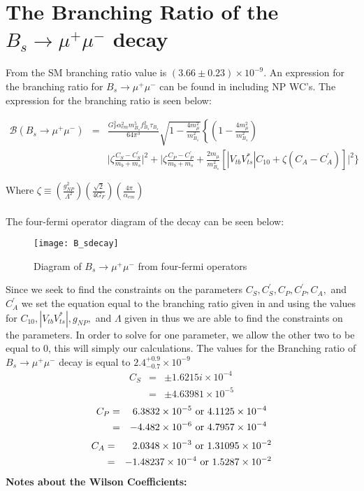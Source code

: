 \documentclass[12pt]{article}
\def \bea{\begin{eqnarray}}
\def \eea{\end{eqnarray}}
\def \({\left(}
\def \){\right)}
\def \lb{\left\{}
\def \nn{\nonumber}
\def \nl{\nn \\}
\def \al{\alpha}
\begin{document}
\section{The Branching Ratio of the $B_s \rightarrow \mu^+\mu^-$ decay}
From \cite{CMS:2014xfa} the SM branching ratio value is $(3.66 \pm 0.23) \times 10 ^ {-9}$. An expression for the branching ratio for $B_s \rightarrow \mu^+\mu^-$ can be found in \cite{Dighe:2012df} including NP WC's. The expression for the branching ratio is seen below:
\begin{center}
\bea
\mathcal{B}(B_s\rightarrow \mu^+\mu^-) &=& \frac{G_F^2 \al_{em}^2 m_{B_s}^5 f_{B_s}^2 \tau_{B_s}}{64\pi^3}\sqrt{1-\frac{4m_\mu^2}{m_{B_s}^2}} \lb\(1-\frac{4m_\mu^2}{m_{B_s}^2}\) \right. \nl 
&& \bigg|\zeta\frac{C_S-C_S^{'}}{m_b+m_s}\bigg|^2+\bigg|\zeta\frac{C_P-C_P^{'}}{m_b+m_s}+\frac{2m_\mu}{m_{B_s}^2}[|V_{tb} V_{ts}^*|C_{10}+\zeta (C_A-C_A^{'})]\bigg|^2\bigg\}
\eea
\end{center}
Where $\zeta \equiv (\frac{g_{NP}^2}{\Lambda^2})(\frac{\sqrt{2}}{4G_F})(\frac{4\pi}{\alpha_{em}})$\\
\\
The four-fermi operator diagram of the decay can be seen below: 
\begin{figure}[h]
\centering
\texttt{[image: B\_sdecay]}
\caption{Diagram of $B_s \rightarrow \mu^+ \mu^-$ from four-fermi operators}
\end{figure}
Since we seek to find the constraints on the parameters $C_S, C_S^{'},C_P, C_P^{'},C_A,$ and $C_A^{'}$ we set the equation equal to the branching ratio given in \cite{flavio} and using the values for $C_{10},|V_{tb} V_{ts}^*|, g_{NP},$ and $\Lambda$ given in \cite{Dighe:2012df} thus we are able to find the constraints on the parameters. In order to solve for one parameter, we allow the other two to be equal to 0, this will simply our calculations. 
The values for the Branching ratio of $B_s\rightarrow \mu^+\mu^- $ decay is equal to $2.4_{-0.7}^{+0.9} \times 10^{-9}$ \cite{Agashe:2014kda}
\bea
C_S&=& \pm 1.6215i \times 10^{-4} \nl
&=& \pm 4.63981\times 10^{-5}\nn
\eea
\bea
C_P&=& 6.3832 \times 10^{-5}~ {\rm or}~ 4.1125\times 10^{-4}\nl
&=&-4.482\times 10^{-6}~ {\rm or}~ 4.7957\times 10^{-4}\nn
\eea
\bea
C_A&=& 2.0348\times 10^{-3}~ {\rm or}~ 1.31095\times 10^{-2}\nl
&=& -1.48237\times 10^{-4} ~ {\rm or}~ 1.5287\times 10^{-2}\nn
\eea
\textbf{Notes about the Wilson Coefficients:}\\
\end{document}
